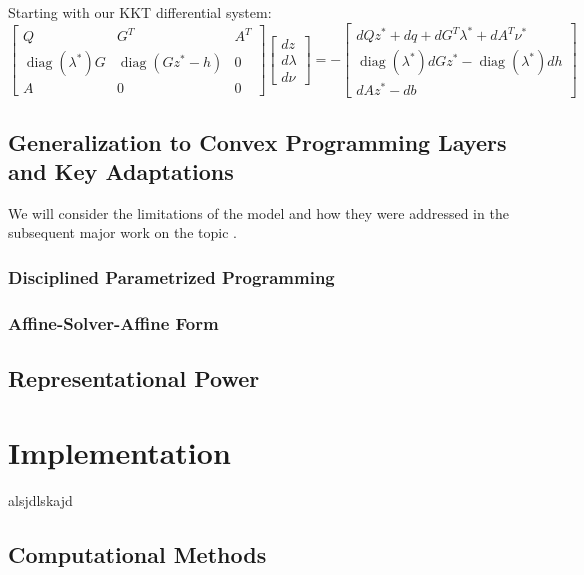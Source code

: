 \documentclass{article}
\DeclareMathOperator{\diag}{diag}
\begin{document}
Starting with our KKT differential system:
\begin{equation}
    \begin{bmatrix}
        Q & G^T & A^T \\
        \diag(\lambda^*) G & \diag(Gz^* - h) & 0 \\
        A & 0 & 0
    \end{bmatrix}
    \begin{bmatrix}
        dz \\
        d\lambda \\
        d\nu
    \end{bmatrix}
    =
    -\begin{bmatrix}
        dQ z^* + dq + dG^T \lambda^* + dA^T \nu^* \\
        \diag(\lambda^*) dG z^* - \diag(\lambda^*) dh \\
        dA z^* - db
    \end{bmatrix}
\end{equation}



\subsection{Generalization to Convex Programming Layers and Key Adaptations}

We will consider the limitations of the model and how they were addressed in the subsequent major work on the topic \citep{differentiableconvexoptimizationlayers}.
    \subsubsection{Disciplined Parametrized Programming}
    \subsubsection{Affine-Solver-Affine Form}
\subsection{Representational Power}

\section{Implementation}

alsjdlskajd
\subsection{Computational Methods}
\end{document}
